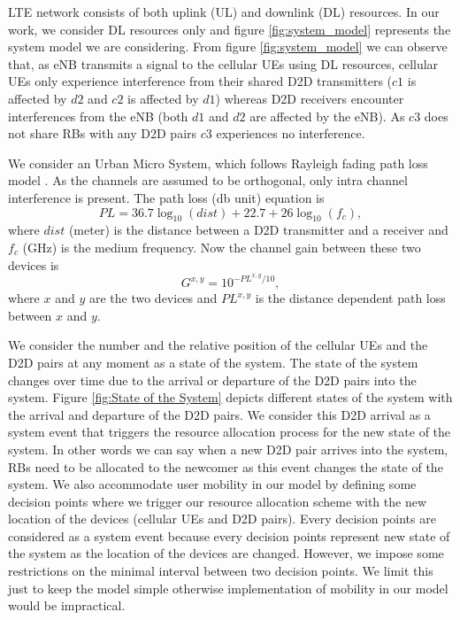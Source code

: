 \documentclass[times]{dacauth}
\begin{document}
\smallskip
\noindent
LTE network consists of both uplink (UL) and downlink (DL) resources.
In our work, we consider DL resources only and figure \ref{fig:system_model} represents the system model we are considering. From  figure \ref{fig:system_model} we can observe that, as eNB transmits a signal to the cellular UEs using DL resources, cellular UEs only experience interference from their shared D2D transmitters ($c1$ is affected by $d2$ and $c2$ is affected by $d1$) whereas D2D receivers encounter interferences from the eNB (both $d1$ and $d2$ are affected by the eNB). As $c3$ does not share RBs with any D2D pairs $c3$ experiences no interference.

\smallskip
\noindent
We consider an Urban Micro System, which follows Rayleigh fading path loss model \cite{lora,zulhasnine, dara}. As the channels are assumed to be orthogonal, only intra channel interference is present. The path loss (db unit) equation is 
\begin{equation}
	PL = 36.7\log_{10}(dist)+22.7+26\log_{10}(f_{c}),
\end{equation}
where $dist$ (meter) is the distance between a D2D transmitter and a receiver and $f_{c}$ (GHz) is the medium frequency.
Now the channel gain between these two devices is 
\begin{equation}
	G^{x,y} = 10^{-PL^{x,y}/10},
\end{equation}
where $x$ and $y$ are the two devices and $PL^{x,y}$ is the distance dependent path loss between $x$ and $y$.

\smallskip


\noindent
We consider the number and the relative position of the cellular UEs and the D2D pairs at any moment as a state of the system. The state of the system changes over time due to the arrival or departure of the D2D pairs into the system. Figure \ref{fig:State of the System} depicts different states of the system with the arrival and departure of the D2D pairs. We consider this D2D arrival as a system event that triggers the resource allocation process for the new state of the system. In other words we can say when a new D2D pair arrives into the system, RBs need to be allocated to the newcomer as this event changes the state of the system. We also accommodate user mobility in our model by defining some decision points where we trigger our resource allocation scheme with the new location of the devices (cellular UEs and D2D pairs). Every decision points are considered as a system event because every decision points represent new state of the system as the location of the devices are changed. However, we impose some restrictions on the minimal interval between two decision points. We limit this just to keep the model simple otherwise implementation of mobility in our model would be impractical.  
\end{document}
